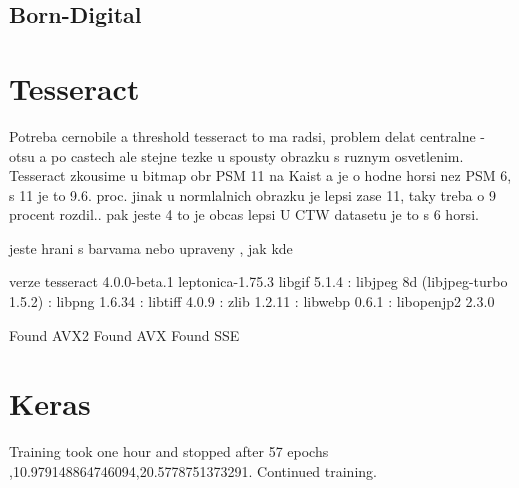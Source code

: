\subsection*{Born-Digital}



\section{Tesseract}
Potreba cernobile a threshold tesseract to ma radsi, problem delat centralne - otsu a po castech ale stejne tezke u spousty obrazku s ruznym osvetlenim.
Tesseract zkousime u bitmap obr PSM 11 na Kaist a je o hodne horsi nez PSM 6, s 11 je to 9.6. proc. jinak u normlalnich obrazku je lepsi zase 11, taky treba o 9 procent rozdil.. pak jeste 4 to je obcas lepsi
U CTW datasetu je to s 6 horsi.

jeste hrani s barvama nebo upraveny , jak kde

verze
tesseract 4.0.0-beta.1
 leptonica-1.75.3
  libgif 5.1.4 : libjpeg 8d (libjpeg-turbo 1.5.2) : libpng 1.6.34 : libtiff 4.0.9 : zlib 1.2.11 : libwebp 0.6.1 : libopenjp2 2.3.0

 Found AVX2
 Found AVX
 Found SSE

\section{Keras}

Training took one hour and stopped after 57 epochs ,10.979148864746094,20.5778751373291. Continued training.
